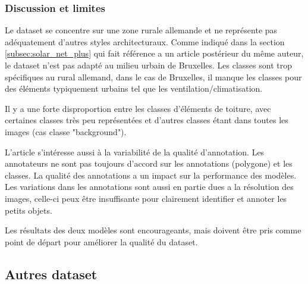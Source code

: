 {{{{\subsubsection{Discussion et limites}
\par{Le dataset se concentre sur une zone rurale allemande et ne représente pas adéquatement d'autres styles architecturaux. Comme indiqué dans la section \ref{subsec:solar_net_plus} qui fait référence a un article postérieur du même auteur, le dataset n'est pas adapté au milieu urbain de Bruxelles. Les classes sont trop spécifiques au rural allemand, dans le cas de Bruxelles, il manque les classes pour des éléments typiquement urbains tel que les ventilation/climatisation.}
\par{Il y a une forte disproportion entre les classes d'éléments de toiture, avec certaines classes très peu représentées et d'autres classes étant dans toutes les images (cas classe "background").}
\par{L'article s'intéresse aussi à la variabilité de la qualité d'annotation. Les annotateurs ne sont pas toujours d'accord sur les annotations (polygone) et les classes. La qualité des annotations a un impact sur la performance des modèles. Les variations dans les annotations sont aussi en partie dues a la résolution des images, celle-ci peux être insuffisante pour clairement identifier et annoter les petits objets.}
\par{Les résultats des deux modèles sont encourageants, mais doivent être pris comme point de départ pour améliorer la qualité du dataset.}

\subsection{Autres dataset}

}}}}
